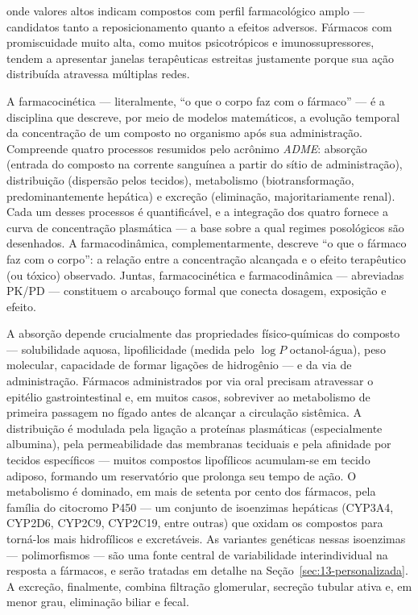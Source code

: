 onde valores altos indicam compostos com perfil farmacológico amplo --- candidatos tanto a reposicionamento quanto a efeitos adversos. Fármacos com promiscuidade muito alta, como muitos psicotrópicos e imunossupressores, tendem a apresentar janelas terapêuticas estreitas justamente porque sua ação distribuída atravessa múltiplas redes.


A farmacocinética --- literalmente, ``o que o corpo faz com o fármaco'' --- é a disciplina que descreve, por meio de modelos matemáticos, a evolução temporal da concentração de um composto no organismo após sua administração. Compreende quatro processos resumidos pelo acrônimo \emph{ADME}: absorção (entrada do composto na corrente sanguínea a partir do sítio de administração), distribuição (dispersão pelos tecidos), metabolismo (biotransformação, predominantemente hepática) e excreção (eliminação, majoritariamente renal). Cada um desses processos é quantificável, e a integração dos quatro fornece a curva de concentração plasmática --- a base sobre a qual regimes posológicos são desenhados. A farmacodinâmica, complementarmente, descreve ``o que o fármaco faz com o corpo'': a relação entre a concentração alcançada e o efeito terapêutico (ou tóxico) observado. Juntas, farmacocinética e farmacodinâmica --- abreviadas PK/PD --- constituem o arcabouço formal que conecta dosagem, exposição e efeito.

A absorção depende crucialmente das propriedades físico-químicas do composto --- solubilidade aquosa, lipofilicidade (medida pelo $\log P$ octanol-água), peso molecular, capacidade de formar ligações de hidrogênio --- e da via de administração. Fármacos administrados por via oral precisam atravessar o epitélio gastrointestinal e, em muitos casos, sobreviver ao metabolismo de primeira passagem no fígado antes de alcançar a circulação sistêmica. A distribuição é modulada pela ligação a proteínas plasmáticas (especialmente albumina), pela permeabilidade das membranas teciduais e pela afinidade por tecidos específicos --- muitos compostos lipofílicos acumulam-se em tecido adiposo, formando um reservatório que prolonga seu tempo de ação. O metabolismo é dominado, em mais de setenta por cento dos fármacos, pela família do citocromo P450 --- um conjunto de isoenzimas hepáticas (CYP3A4, CYP2D6, CYP2C9, CYP2C19, entre outras) que oxidam os compostos para torná-los mais hidrofílicos e excretáveis. As variantes genéticas nessas isoenzimas --- polimorfismos --- são uma fonte central de variabilidade interindividual na resposta a fármacos, e serão tratadas em detalhe na Seção~\ref{sec:13-personalizada}. A excreção, finalmente, combina filtração glomerular, secreção tubular ativa e, em menor grau, eliminação biliar e fecal.

